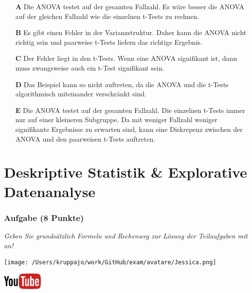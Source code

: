 \documentclass[a4paper, 9pt]{scrartcl}\usepackage[]{graphicx}\usepackage[]{xcolor}
\begin{document}
\begin{enumerate}
\item [\textbf{A} \msquare] Die ANOVA testet auf der gesamten Fallzahl. Es wäre besser die ANOVA auf der gleichen Fallzahl wie die einzelnen t-Tests zu rechnen.
\item [\textbf{B} \msquare] Es gibt einen Fehler in der Varianzstruktur. Daher kann die ANOVA nicht richtig sein und paarweise t-Tests liefern das richtige Ergebnis.
\item [\textbf{C} \msquare] Der Fehler liegt in den t-Tests. Wenn eine ANOVA signifikant ist, dann muss zwangsweise auch ein t-Test signifikant sein.
\item [\textbf{D} \msquare] Das Beispiel kann so nicht auftreten, da die ANOVA und die t-Tests algorithmisch miteinander verschränkt sind.
\item [\textbf{E} \msquare] Die ANOVA testet auf der gesamten Fallzahl. Die einzelnen t-Tests immer nur auf einer kleineren Subgruppe. Da mit weniger Fallzahl weniger signifikante Ergebnisse zu erwarten sind, kann eine Diskrepenz zwischen der ANOVA und den paarweisen t-Tests auftreten.
\end{enumerate}
    
\clearpage
\part{Deskriptive Statistik \& Explorative Datenanalyse}

\section{Aufgabe \hfill (8 Punkte)}

\textit{Geben Sie grundsätzlich Formeln und Rechenweg zur Lösung der Teilaufgaben mit an!} \\[1Ex]
 

 
\begin{minipage}[t]{0.5\textwidth}
\texttt{[image: /Users/kruppajo/work/GitHub/exam/avatare/Jessica.png]}
\end{minipage}
\begin{minipage}[t]{0.5\textwidth}
\hfill
\href{https://youtu.be/t0WYa_LVc5o}{\includegraphics[width = 2cm]{img/youtube}}\\[1Ex]
\end{minipage}
\vspace{1ex}
\end{document}
